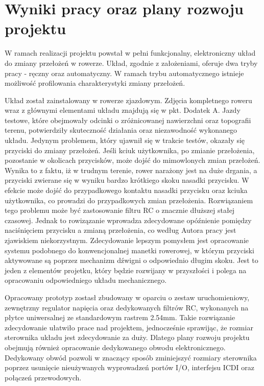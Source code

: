 \chapter{Wyniki pracy oraz plany rozwoju projektu}
W ramach realizacji projektu powstał w pełni funkcjonalny, elektroniczny układ do zmiany przełożeń w rowerze. Układ, zgodnie z założeniami, oferuje dwa tryby pracy - ręczny oraz automatyczny. W ramach trybu automatycznego istnieje możliwość profilowania charakterystyki zmiany przełożeń.

Układ został zainstalowany w rowerze zjazdowym. Zdjęcia kompletnego roweru wraz z głównymi elementami układu znajdują się w pkt. Dodatek A. Jazdy testowe, które obejmowały odcinki o zróżnicowanej nawierzchni oraz topografii terenu, potwierdziły skuteczność działania oraz niezawodność wykonanego układu. Jedynym problemem, który ujawnił się w trakcie testów, okazały się przyciski do zmiany przełożeń. Jeśli kciuk użytkownika, po zmianie przełożenia, pozostanie w okolicach przycisków, może dojść do mimowlonych zmian przełożeń. Wynika to z faktu, iż w trudnym terenie, rower narażony jest na duże drgania, a przyciski zwierane się w wyniku bardzo krótkiego skoku nasadki przycisku. W efekcie może dojść do przypadkowego kontaktu nasadki przycisku oraz kciuka użytkownika, co prowadzi do przypadkowych zmian przełożenia. Rozwiązaniem tego problemu może być zastosowanie filtru RC o znacznie dłuższej stałej czasowej. Jednak to rowizązanie wprowadza zdecydowane opóźnienie pomiędzy naciśnięciem przycisku a zmianą przełożenia, co według Autora pracy jest zjawiskiem niekorzystnym. Zdecydowanie lepszym pomysłem jest opracowanie systemu podobnego do konwencjonalnej manetki rowerowej, w którym przyciski aktywowane są poprzez mechanizm dźwigni o odpowiednio długim skoku. Jest to jeden z elementów projetku, który będzie rozwijany w przyszłości i polega na opracowaniu odpowiedniego układu mechanicznego.

Opracowany prototyp zostasł zbudowany w oparciu o zestaw uruchomieniowy, zewnętrzny regulator napięcia oraz dedykowanych filtrów RC, wykonanych na płytce uniwersalnej ze standardowym rastrem 2.54mm. Takie rozwiązanie zdecydowanie ułatwiło prace nad projektem, jednocześnie sprawijąc, że rozmiar sterownika układu jest zdecydowanie za duży. Dlatego plany rozwoju projektu obejmują również opracowanie dedykowanego obwodu elektronicznego. Dedykowany obwód pozwoli w znaczący sposób zminiejszyć rozmiary sterownika poprzez usunięcie nieużywanych wyprowadzeń portów I/O, interfejsu ICDI oraz połączeń przewodowych. 

